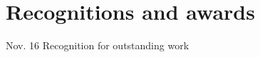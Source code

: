 \documentclass[american]{cv-class}
\begin{document}
\section{Recognitions and awards}
\begin{entrylist}
	\entry
	{Nov. 16}
	{Recognition for outstanding work}
	{ }
	{\href{https://drive.google.com/file/d/1s3JcyGUWUQywj2yR52MkYJc2ZJGantP9/view?usp=sharing}{}
	}
	

\end{entrylist}
\end{document}
